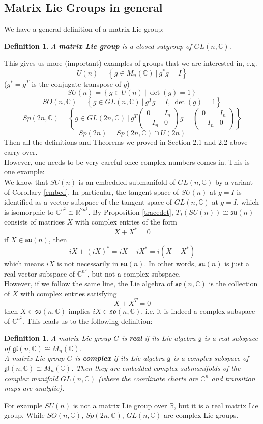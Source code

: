 \documentclass[11pt]{article}
\newtheorem{definition}[theorem]{Definition}
\newcommand{\bb}[1]{\mathbb{#1}}
\newcommand{\mf}[1]{\mathfrak{#1}}
\begin{document}
\subsection{Matrix Lie Groups in general}
We have a general definition of a matrix Lie group:
\begin{definition}
A \textbf{matrix Lie group} is a closed subgroup of $GL(n,\bb{C})$.
\end{definition}
This gives us more (important) examples of groups that we are interested in, e.g.
$$U(n) = \left\{ g \in M_n(\bb{C})\ \Big|\ g^*g = I\right\}$$
($g^* = \bar{g}^T$ is the conjugate transpose of $g$)
$$SU(n) = \left\{ g \in U(n)\ \Big|\ \det(g) = 1\right\}$$
$$SO(n,\bb{C}) = \left\{g \in GL(n,\bb{C})\ \Big|\ g^Tg = I,\ \det(g) = 1 \right\}$$
$$Sp(2n,\bb{C})= \left\{g \in GL(2n,\bb{C})\ \Big|\ g^T\left( \begin{array}{cc}
0 & I_n \\
-I_n & 0 \end{array} \right)g = \left( \begin{array}{cc}
0 & I_n \\
-I_n & 0 \end{array} \right) \right\}$$
$$Sp(2n) = Sp(2n,\bb{C}) \cap U(2n)$$
Then all the definitions and Theorems we proved in Section 2.1 and 2.2 above carry over.\\
However, one needs to be very careful once complex numbers comes in. This is one example:\\
We know that $SU(n)$ is an embedded submanifold of $GL(n,\bb{C})$ by a variant of Corollary \ref{embed}. In particular, the tangent space of $SU(n)$ at $g = I$ is identified as a vector subspace of the tangent space of $GL(n,\bb{C})$ at $g = I$, which is isomorphic to $\bb{C}^{n^2} \cong \bb{R}^{2n^2}$. By Proposition \ref{tracedet}, $T_I(SU(n)) \cong \mf{su}(n)$ consists of matrices $X$ with complex entries of the form
$$X + X^* = 0$$
if $X \in \mf{su}(n)$, then
$$iX + (iX)^* = iX - iX^* = i(X - X^*)$$
which means $iX$ is not necessarily in $\mf{su}(n)$. In other words, $\mf{su}(n)$ is just a real vector subspace of $\bb{C}^{n^2}$, but not a complex subspace.\\
However, if we follow the same line, the Lie algebra of $\mf{so}(n,\bb{C})$ is the collection of $X$ with complex entries satisfying
$$X + X^T = 0$$
then $X \in \mf{so}(n,\bb{C})$ implies $iX \in \mf{so}(n,\bb{C})$, i.e. it is indeed a complex subspace of $\bb{C}^{n^2}$. This leads us to the following definition:
\begin{definition}
A matrix Lie group $G$ is \textbf{real} if its Lie algebra $\mf{g}$ is a real subspace of $\mf{gl}(n,\bb{C}) \cong M_n(\bb{C})$.\\
A matrix Lie group $G$ is \textbf{complex} if its Lie algebra $\mf{g}$ is a complex subspace of $\mf{gl}(n,\bb{C}) \cong M_n(\bb{C})$. Then they are embedded \textit{complex submanifolds} of the complex manifold $GL(n,\bb{C})$ (where the coordinate charts are $\bb{C}^n$ and transition maps are \textit{analytic}).
\end{definition}
For example $SU(n)$ is not a matrix Lie group over $\bb{R}$, but it is a real matrix Lie group. While $SO(n,\bb{C})$, $Sp(2n,\bb{C})$, $GL(n,\bb{C})$ are complex Lie groups.
\end{document}
